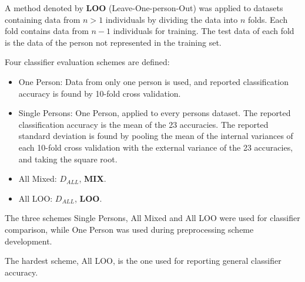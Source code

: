 A method denoted by \textbf{LOO} (Leave-One-person-Out) was applied to datasets
containing data from \(n>1\) individuals by dividing
the data into \(n\) folds. Each fold contains data from \(n-1\)
individuals for training. The test data of each fold is the
data of the person not represented in the training set.

Four classifier evaluation schemes are defined:
\begin{itemize}
\item One Person:
Data from only one person is used,
and reported classification accuracy is found by 10-fold cross validation.
\item Single Persons:
One Person, applied to every persons dataset. The reported
classification accuracy is the mean of the 23 accuracies.
The reported standard deviation is found by pooling
the mean of the internal variances of each 10-fold cross validation
with the external variance of the 23 accuracies,
and taking the square root.
\item All Mixed:
\(D_{ALL}\), \textbf{MIX}.
\item All LOO:
\(D_{ALL}\), \textbf{LOO}.
\end{itemize}
The three schemes Single Persons, All Mixed and All LOO
were used for classifier comparison,
while One Person was used during preprocessing
scheme development.

The hardest scheme, All LOO, is the one used for
reporting general classifier accuracy.

